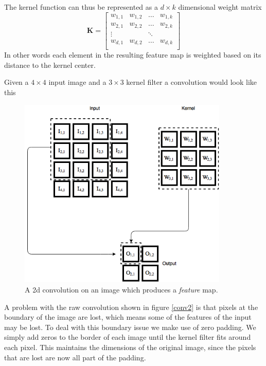 \documentclass[11pt]{article}
\begin{document}
The kernel function can thus be represented as a $d \times k$ dimensional weight matrix
$$
\mathbf{K} =
\begin{bmatrix}
    w_{1,1 } & w_{1, 2} & \hdots & w_{1, k} \\
    w_{2,1 } & w_{2, 2} & \hdots & w_{2, k} \\
    \vdots   &          & \ddots &          \\
    w_{d,1 } & w_{d, 2} & \hdots & w_{d, k} \\
\end{bmatrix}
$$
In other words each element in the resulting feature map is weighted
based on its distance to the kernel center.

Given a $4 \times 4$ input image and a $3 \times 3$ kernel filter a convolution
would look like this
\begin{figure}[!h]\label{con2}
    \centering
    \includegraphics[width=10cm]{include/conv_2.png}
    \caption{A 2d convolution on an image which produces a \textit{feature} map.}
    \label{fig:conv}
\end{figure}

A problem with the raw convolution shown in figure \ref{conv2} is that
pixels at the boundary of the image are lost, which means some of the
features of the input may be lost.
To deal with this boundary issue we make use of zero padding.
We simply add zeros to the border of each image until the kernel
filter fits around each pixel.
This maintains the dimensions of the original image, since the pixels that are lost are
now all part of the padding.
\end{document}
